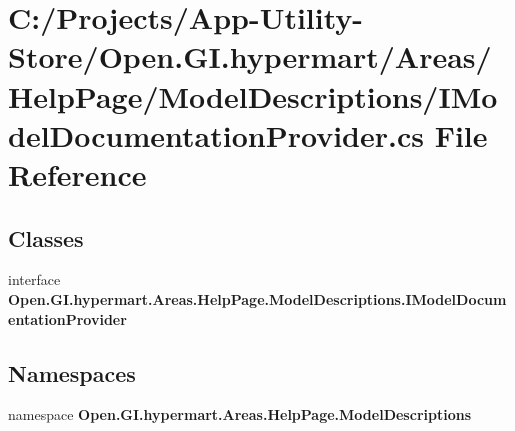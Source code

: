 \section{C\+:/\+Projects/\+App-\/\+Utility-\/\+Store/\+Open.G\+I.\+hypermart/\+Areas/\+Help\+Page/\+Model\+Descriptions/\+I\+Model\+Documentation\+Provider.cs File Reference}
\label{_i_model_documentation_provider_8cs}
\subsection*{Classes}
\begin{DoxyCompactItemize}
\item 
interface \textbf{ Open.\+G\+I.\+hypermart.\+Areas.\+Help\+Page.\+Model\+Descriptions.\+I\+Model\+Documentation\+Provider}
\end{DoxyCompactItemize}
\subsection*{Namespaces}
\begin{DoxyCompactItemize}
\item 
namespace \textbf{ Open.\+G\+I.\+hypermart.\+Areas.\+Help\+Page.\+Model\+Descriptions}
\end{DoxyCompactItemize}
